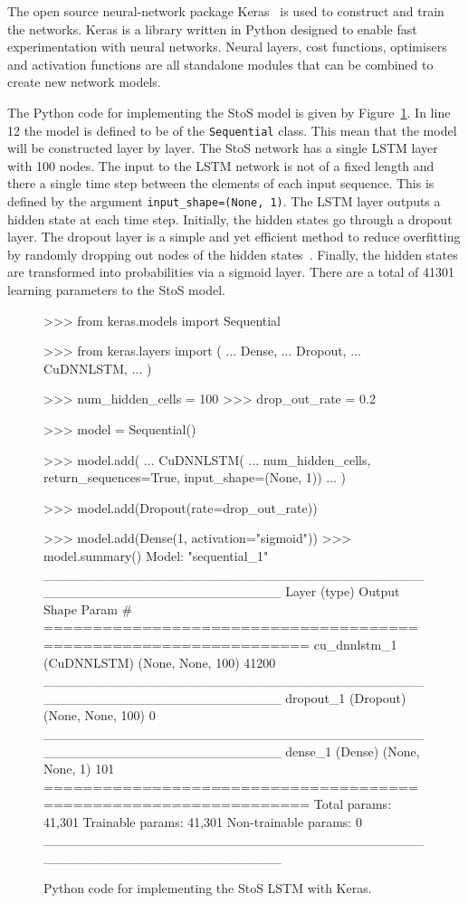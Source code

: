The open source neural-network package Keras~\cite{Chollet2015} is used to
construct and train the networks. Keras is a library written in Python designed
to enable fast experimentation with neural networks. Neural layers, cost
functions, optimisers and activation functions are all standalone modules that
can be combined to create new network models.

The Python code for implementing the StoS model is given by
Figure~\ref{fig:keras_sequence_to_sequence}. In line 12 the model is defined to
be of the \texttt{Sequential} class. This mean that the model will
be constructed layer by layer. The StoS network has a single LSTM layer with 100
nodes. The input to the LSTM network is not of a fixed length and there a single
time step between the elements of each input sequence. This is defined by the
argument \texttt{input_shape=(None, 1)}. The LSTM layer outputs a
hidden state at each time step. Initially, the hidden states go through a
dropout layer. The dropout layer is a simple and yet efficient method to reduce
overfitting by randomly dropping out nodes of the hidden
states~\cite{Baldi2013}. Finally, the hidden states are transformed into
probabilities via a sigmoid layer. There are a total of 41301 learning
parameters to the StoS model.

\begin{figure}[!htbp]
\begin{usagepy}
>>> from keras.models import Sequential

>>> from keras.layers import (
...     Dense,
...     Dropout,
...     CuDNNLSTM,
... )

>>> num_hidden_cells = 100
>>> drop_out_rate = 0.2

>>> model = Sequential()

>>> model.add(
...    CuDNNLSTM(
...        num_hidden_cells, return_sequences=True, input_shape=(None, 1))
... )

>>> model.add(Dropout(rate=drop_out_rate))

>>> model.add(Dense(1, activation="sigmoid"))
>>> model.summary()
Model: "sequential_1"
_________________________________________________________________
Layer (type)                 Output Shape              Param #   
=================================================================
cu_dnnlstm_1 (CuDNNLSTM)     (None, None, 100)         41200     
_________________________________________________________________
dropout_1 (Dropout)          (None, None, 100)         0         
_________________________________________________________________
dense_1 (Dense)              (None, None, 1)           101       
=================================================================
Total params: 41,301
Trainable params: 41,301
Non-trainable params: 0
_________________________________________________________________

\end{usagepy}
\caption{Python code for implementing the StoS LSTM with Keras.}\label{fig:keras_sequence_to_sequence}
\end{figure}


